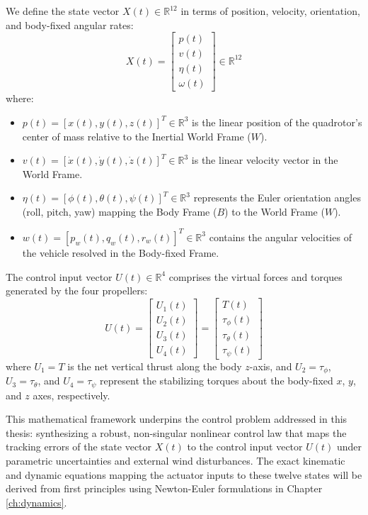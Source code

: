 We define the state vector $X(t) \in \mathbb{R}^{12}$ in terms of position, velocity, orientation, and body-fixed angular rates:
\begin{equation}
X(t) = \begin{bmatrix} p(t) \\ v(t) \\ \eta(t) \\ \omega(t) \end{bmatrix} \in \mathbb{R}^{12}
\end{equation}
where:
\begin{itemize}
    \item $p(t) = [x(t), y(t), z(t)]^T \in \mathbb{R}^3$ is the linear position of the quadrotor's center of mass relative to the Inertial World Frame ($W$).
    \item $v(t) = [\dot{x}(t), \dot{y}(t), \dot{z}(t)]^T \in \mathbb{R}^3$ is the linear velocity vector in the World Frame.
    \item $\eta(t) = [\phi(t), \theta(t), \psi(t)]^T \in \mathbb{R}^3$ represents the Euler orientation angles (roll, pitch, yaw) mapping the Body Frame ($B$) to the World Frame ($W$).
    \item $w(t) = [p_w(t), q_w(t), r_w(t)]^T \in \mathbb{R}^3$ contains the angular velocities of the vehicle resolved in the Body-fixed Frame.
\end{itemize}

The control input vector $U(t) \in \mathbb{R}^4$ comprises the virtual forces and torques generated by the four propellers:
\begin{equation}
U(t) = \begin{bmatrix} U_1(t) \\ U_2(t) \\ U_3(t) \\ U_4(t) \end{bmatrix} = \begin{bmatrix} T(t) \\ \tau_{\phi}(t) \\ \tau_{\theta}(t) \\ \tau_{\psi}(t) \end{bmatrix}
\end{equation}
where $U_1 = T$ is the net vertical thrust along the body $z$-axis, and $U_2 = \tau_{\phi}$, $U_3 = \tau_{\theta}$, and $U_4 = \tau_{\psi}$ represent the stabilizing torques about the body-fixed $x$, $y$, and $z$ axes, respectively. 

This mathematical framework underpins the control problem addressed in this thesis: synthesizing a robust, non-singular nonlinear control law that maps the tracking errors of the state vector $X(t)$ to the control input vector $U(t)$ under parametric uncertainties and external wind disturbances. The exact kinematic and dynamic equations mapping the actuator inputs to these twelve states will be derived from first principles using Newton-Euler formulations in Chapter \ref{ch:dynamics}.

